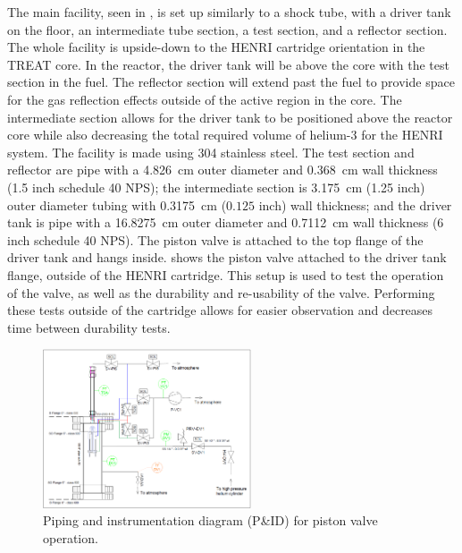 The main facility, seen in , is set up similarly to a shock tube, with a driver tank on the floor, an intermediate tube section, a test section, and a reflector section.
The whole facility is upside-down to the HENRI cartridge orientation in the TREAT core.
In the reactor, the driver tank will be above the core with the test section in the fuel.
The reflector section will extend past the fuel to provide space for the gas reflection effects outside of the active region in the core.
The intermediate section allows for the driver tank to be positioned above the reactor core while also decreasing the total required volume of helium-3 for the HENRI system.
The facility is made using 304 stainless steel.
The test section and reflector are pipe with a \SI{4.826}{\centi\meter} outer diameter and \SI{0.368}{\centi\meter} wall thickness (1.5 inch schedule 40 NPS); the intermediate section is \SI{3.175}{\centi\meter} (1.25 inch) outer diameter tubing with \SI{0.3175}{\centi\meter} ($0.125$ inch) wall thickness; and the driver tank is pipe with a \SI{16.8275}{\centi\meter} outer diameter and \SI{0.7112}{\centi\meter} wall thickness (6 inch schedule 40 NPS).
The piston valve is attached to the top flange of the driver tank and hangs inside.  shows the piston valve attached to the driver tank flange, outside of the HENRI cartridge.
This setup is used to test the operation of the valve, as well as the durability and re-usability of the valve.
Performing these tests outside of the cartridge allows for easier observation and decreases time between durability tests.


%
\begin{figure}[tb]
    \vspace{16pt}
    \centering
    \includegraphics[width=0.55\textwidth]{experiment/photos/HENRI_valve_PID.PNG}
    \caption{Piping and instrumentation diagram (P\&ID) for piston valve operation.}
    \label{fig:sv pid}
    \vspace{16pt}
\end{figure}
%


